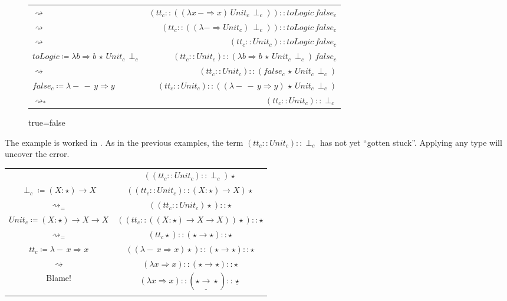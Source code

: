 \begin{sidewaysfigure}
\begin{tabular}{lr}
$\rightsquigarrow$ & $\left(tt_{c}::\left(\left(\lambda x\,-\Rightarrow x\right)\,Unit_{c}\,\perp_{c}\right)\right)::toLogic\,false_{c}$\tabularnewline
$\rightsquigarrow$ & $\left(tt_{c}::\left(\left(\lambda-\Rightarrow Unit_{c}\right)\,\perp_{c}\right)\right)::toLogic\,false_{c}$\tabularnewline
$\rightsquigarrow$ & $\left(tt_{c}::Unit_{c}\right)::toLogic\,false_{c}$\tabularnewline
$toLogic\coloneqq\lambda b\Rightarrow b\,\star\,Unit_{c}\,\perp_{c}$ & $\left(tt_{c}::Unit_{c}\right)::\left(\lambda b\Rightarrow b\,\star\,Unit_{c}\,\perp_{c}\right)\,false_{c}$\tabularnewline
$\rightsquigarrow$ & $\left(tt_{c}::Unit_{c}\right)::\left(false_{c}\,\star\,Unit_{c}\,\perp_{c}\right)$\tabularnewline
$false_{c}\coloneqq\lambda-\,-\,y\Rightarrow y$ & $\left(tt_{c}::Unit_{c}\right)::\left(\left(\lambda-\,-\,y\Rightarrow y\right)\,\star\,Unit_{c}\,\perp_{c}\right)$\tabularnewline
$\rightsquigarrow_{*}$ & $\left(tt_{c}::Unit_{c}\right)::\perp_{c}$\tabularnewline
\end{tabular}
\caption{true=false}
\label{fig:cast-ex-tf}
\end{sidewaysfigure}
 
The example is worked in .
As in the previous examples, the term $\left(tt_{c}::Unit_{c}\right)::\perp_{c}$ has not yet ``gotten stuck''.
Applying any type will uncover the error.
 
\begin{tabular}{cc}
& $\left(\left(tt_{c}::Unit_{c}\right)::\perp_{c}\right)\star$\tabularnewline
$\perp_{c}\coloneqq\left(X:\star\right)\rightarrow X$ & $\left(\left(tt_{c}::Unit_{c}\right)::\left(X:\star\right)\rightarrow X\right)\star$\tabularnewline
$\rightsquigarrow_{=}$ & $\left(\left(tt_{c}::Unit_{c}\right)\star\right)::\star$\tabularnewline
$Unit_{c}\coloneqq\left(X:\star\right)\rightarrow X\rightarrow X$ & $\left(\left(tt_{c}::\left(\left(X:\star\right)\rightarrow X\rightarrow X\right)\right)\star\right)::\star$\tabularnewline
$\rightsquigarrow_{=}$ & $\left(tt_{c}\star\right)::\left(\star\rightarrow\star\right)::\star$\tabularnewline
$tt_{c}\coloneqq\lambda-\,x\Rightarrow x$ & $\left(\left(\lambda-\,x\Rightarrow x\right)\star\right)::\left(\star\rightarrow\star\right)::\star$\tabularnewline
$\rightsquigarrow$ & $\left(\lambda x\Rightarrow x\right)::\left(\star\rightarrow\star\right)::\star$\tabularnewline
Blame! & $\left(\lambda x\Rightarrow x\right)::\left(\star\underline{\rightarrow}\star\right)::\underline{\star}$\tabularnewline
& \tabularnewline
\end{tabular}
 
